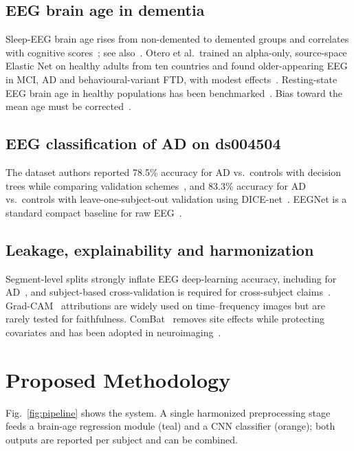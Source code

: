 \documentclass[journal]{IEEEtran}
\begin{document}
\subsection{EEG brain age in dementia}
Sleep-EEG brain age rises from non-demented to demented groups and correlates with cognitive scores~\cite{ye2020}; see also~\cite{sun2019}. Otero et al.\ trained an alpha-only, source-space Elastic Net on healthy adults from ten countries and found older-appearing EEG in MCI, AD and behavioural-variant FTD, with modest effects~\cite{otero2026}. Resting-state EEG brain age in healthy populations has been benchmarked~\cite{alzoubi2018,engemann2022}. Bias toward the mean age must be corrected~\cite{delange2020}.

\subsection{EEG classification of AD on ds004504}
The dataset authors reported 78.5\% accuracy for AD vs.\ controls with decision trees while comparing validation schemes~\cite{miltiadous2021}, and 83.3\% accuracy for AD vs.\ controls with leave-one-subject-out validation using DICE-net~\cite{miltiadous2023dice}. EEGNet is a standard compact baseline for raw EEG~\cite{eegnet}.

\subsection{Leakage, explainability and harmonization}
Segment-level splits strongly inflate EEG deep-learning accuracy, including for AD~\cite{brookshire2024}, and subject-based cross-validation is required for cross-subject claims~\cite{delpup2025}. Grad-CAM~\cite{gradcam} attributions are widely used on time--frequency images but are rarely tested for faithfulness. ComBat~\cite{johnson2007} removes site effects while protecting covariates and has been adopted in neuroimaging~\cite{fortin2018}.

\section{Proposed Methodology}
Fig.~\ref{fig:pipeline} shows the system. A single harmonized preprocessing stage feeds a brain-age regression module (teal) and a CNN classifier (orange); both outputs are reported per subject and can be combined.
\end{document}
